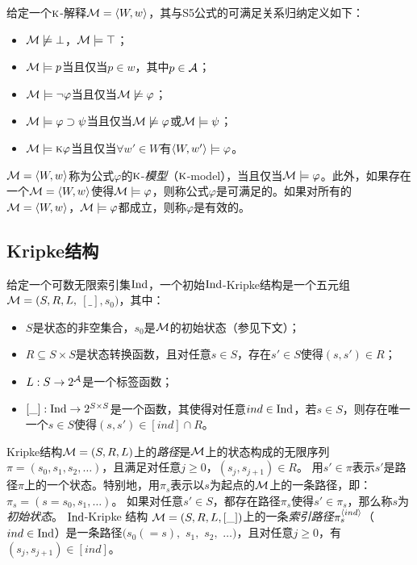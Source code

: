 \begin{definition}\label{def:s5:interp}
	给定一个$\textsc{k}$-解释${\cal M}={\langle{W,w}\rangle}$，其与S5公式的可满足关系归纳定义如下：
	\begin{itemize}
		\item ${\cal M} \not \models \bot$，${\cal M} \models \top$；
		\item ${\cal M} \models p$当且仅当$p\in w$，其中$p\in {\cal A}$；
		\item ${\cal M} \models \neg \varphi$当且仅当${\cal M} \not \models \varphi$；
		\item ${\cal M} \models \varphi \supset \psi$当且仅当${\cal M} \not \models \varphi$或${\cal M} \models \psi$；
		\item ${\cal M} \models \textsc{k} \varphi$当且仅当$\forall w'\in W$有${\langle{W, w'}\rangle}\models \varphi$。
	\end{itemize}
\end{definition}

${\cal M}={\langle{W,w}\rangle}$称为公式$\varphi$的$\textsc{k}$-\emph{模型}（$\textsc{k}$-model），当且仅当${\cal M} \models \varphi$。此外，如果存在一个${\cal M}={\langle{W,w}\rangle}$使得${\cal M}\models \varphi$，则称公式$\varphi$是可满足的。如果对所有的${\cal M}={\langle{W,w}\rangle}$，${\cal M}\models \varphi$都成立，则称$\varphi$是有效的。


\subsection{Kripke结构}
给定一个可数无限索引集$\textrm{Ind}$，一个初始$\textrm{Ind}$-Kripke结构是一个五元组${\cal M}=(S,R,L,$ $[\_],s_0)$，其中：
\begin{itemize}
	\item $S$是状态的非空集合，$s_0$是${\cal M}$的初始状态（参见下文）；
	\item $R \subseteq S \times S$是状态转换函数，且对任意$s\in S$，存在$s'\in S$使得$(s,s') \in R$；
	\item $L:S\rightarrow 2^{{\cal A}}$是一个标签函数；
	\item $[\_]: \textrm{Ind} \rightarrow 2^{S \times S}$是一个函数，其使得对任意$ind \in\textrm{Ind}$，若$s\in S$，则存在唯一一个$s\in S$使得$(s,s')\in [ind]\cap R$。%
\end{itemize}

Kripke结构${\cal M}=(S,R,L)$上的{\em 路径}是${\cal M}$上的状态构成的无限序列$\pi=(s_0, s_{1}, s_{2},\dots)$，且满足对任意$j\ge 0$，$(s_j, s_{j+1}) \in R$。
用$s'\in \pi$表示$s'$是路径$\pi$上的一个状态。特别地，用$\pi_{s}$表示以$s$为起点的${\cal M}$上的一条路径，即：$\pi_{s}=(s=s_0,s_1,\dots)$。
如果对任意$s'\in S$，都存在路径$\pi_{s}$使得$s'\in \pi_{s}$，那么称$s$为\emph{初始状态}。
$\textrm{Ind}$-Kripke 结构 ${\cal M}=(S,R,L, [\_])$上的一条\emph{索引路径}$\pi_{s}^{{\langle{ind}\rangle}}$（$ind \in \textrm{Ind}$）是一条路径$(s_0(=s),$ $s_{1},$ $s_{2},$ $\dots)$，且对任意$j \geq 0$，有$(s_j, s_{j+1}) \in [ind]$。

